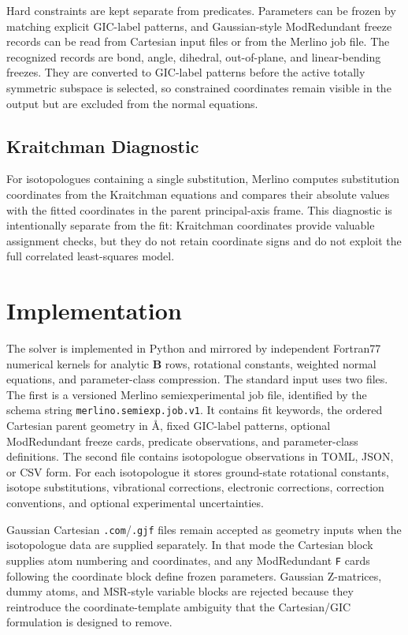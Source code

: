 \documentclass[journal=jctcce,manuscript=article,maxauthors=999]{achemso}
\begin{document}
Hard constraints are kept separate from predicates. Parameters can be frozen by matching explicit GIC-label patterns, and Gaussian-style ModRedundant freeze records can be read from Cartesian input files or from the Merlino job file. The recognized records are bond, angle, dihedral, out-of-plane, and linear-bending freezes. They are converted to GIC-label patterns before the active totally symmetric subspace is selected, so constrained coordinates remain visible in the output but are excluded from the normal equations.

\subsection{Kraitchman Diagnostic}

For isotopologues containing a single substitution, Merlino computes substitution coordinates from the Kraitchman equations and compares their absolute values with the fitted coordinates in the parent principal-axis frame. This diagnostic is intentionally separate from the fit: Kraitchman coordinates provide valuable assignment checks, but they do not retain coordinate signs and do not exploit the full correlated least-squares model.

\section{Implementation}

The solver is implemented in Python and mirrored by independent Fortran77 numerical kernels for analytic $\mathbf{B}$ rows, rotational constants, weighted normal equations, and parameter-class compression. The standard input uses two files. The first is a versioned Merlino semiexperimental job file, identified by the schema string \texttt{merlino.semiexp.job.v1}. It contains fit keywords, the ordered Cartesian parent geometry in \si{\angstrom}, fixed GIC-label patterns, optional ModRedundant freeze cards, predicate observations, and parameter-class definitions. The second file contains isotopologue observations in TOML, JSON, or CSV form. For each isotopologue it stores ground-state rotational constants, isotope substitutions, vibrational corrections, electronic corrections, correction conventions, and optional experimental uncertainties.

Gaussian Cartesian \texttt{.com}/\texttt{.gjf} files remain accepted as geometry inputs when the isotopologue data are supplied separately. In that mode the Cartesian block supplies atom numbering and coordinates, and any ModRedundant \texttt{F} cards following the coordinate block define frozen parameters. Gaussian Z-matrices, dummy atoms, and MSR-style variable blocks are rejected because they reintroduce the coordinate-template ambiguity that the Cartesian/GIC formulation is designed to remove.
\end{document}
